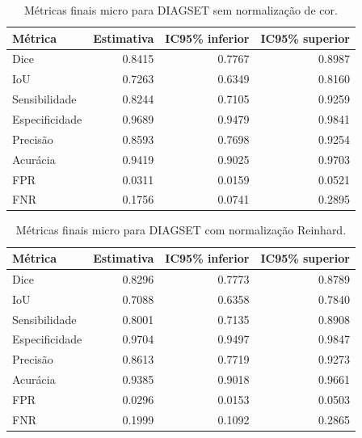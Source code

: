 \begin{table}[!htb]
\centering
\caption{Métricas finais micro para DIAGSET sem normalização de cor.}
\label{tab:results_diagset-micro-not_normalized}
\small
\begin{tabular}{lrrr}
\toprule
Métrica & Estimativa & IC95\% inferior & IC95\% superior \\
\midrule
Dice & 0.8415 & 0.7767 & 0.8987 \\
IoU & 0.7263 & 0.6349 & 0.8160 \\
Sensibilidade & 0.8244 & 0.7105 & 0.9259 \\
Especificidade & 0.9689 & 0.9479 & 0.9841 \\
Precisão & 0.8593 & 0.7698 & 0.9254 \\
Acurácia & 0.9419 & 0.9025 & 0.9703 \\
FPR & 0.0311 & 0.0159 & 0.0521 \\
FNR & 0.1756 & 0.0741 & 0.2895 \\
\bottomrule
\end{tabular}
\end{table}

\begin{table}[!htb]
\centering
\caption{Métricas finais micro para DIAGSET com normalização Reinhard.}
\label{tab:results_diagset-micro-reinhard}
\small
\begin{tabular}{lrrr}
\toprule
Métrica & Estimativa & IC95\% inferior & IC95\% superior \\
\midrule
Dice & 0.8296 & 0.7773 & 0.8789 \\
IoU & 0.7088 & 0.6358 & 0.7840 \\
Sensibilidade & 0.8001 & 0.7135 & 0.8908 \\
Especificidade & 0.9704 & 0.9497 & 0.9847 \\
Precisão & 0.8613 & 0.7719 & 0.9273 \\
Acurácia & 0.9385 & 0.9018 & 0.9661 \\
FPR & 0.0296 & 0.0153 & 0.0503 \\
FNR & 0.1999 & 0.1092 & 0.2865 \\
\bottomrule
\end{tabular}
\end{table}


